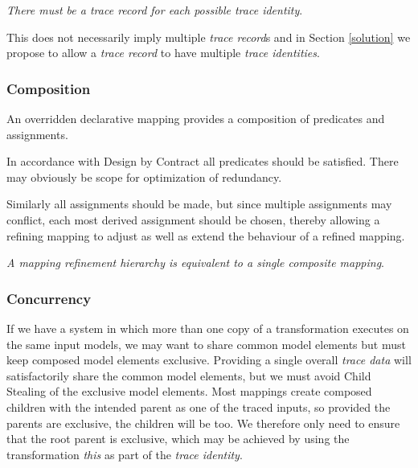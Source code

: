 \documentclass[runningheads,a4paper]{llncs}
\begin{document}
\emph{There must be a trace record for each possible trace identity}.

This does not necessarily imply multiple \emph{trace record}s and in Section \ref{solution} we propose to allow a \emph{trace record} to have multiple \emph{trace identities}.

\subsubsection{Composition}

An overridden declarative mapping provides a composition of predicates and assignments.

In accordance with Design by Contract\cite{dBc} all predicates should be satisfied. There may obviously be scope for optimization of redundancy.

Similarly all assignments should be made, but since multiple assignments may conflict, each most derived assignment should be chosen, thereby allowing a refining mapping to adjust as well as extend the behaviour of a refined mapping.

\emph{A mapping refinement hierarchy is equivalent to a single composite mapping}.



\subsubsection{Concurrency}

If we have a system in which more than one copy of a transformation executes on the same input models, we may want to share common model elements but must keep composed model elements exclusive. Providing a single overall \emph{trace data} will satisfactorily share the common model elements, but we must avoid Child Stealing of the exclusive model elements. Most mappings create composed children with the intended parent as one of the traced inputs, so provided the parents are exclusive, the children will be too. We therefore only need to ensure that the root parent is exclusive, which may be achieved by using the transformation \emph{this} as part of the \emph{trace identity}.
\end{document}
